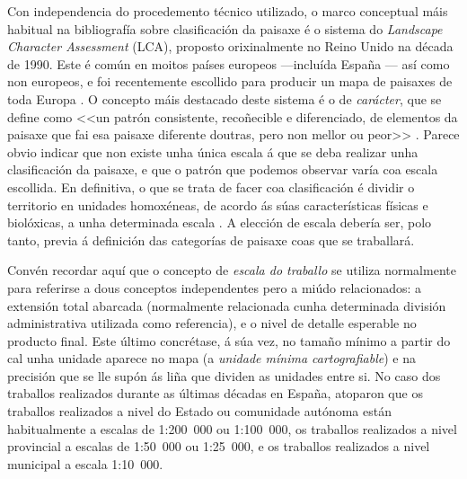 \documentclass[11pt,a4paper]{article}
\begin{document}
Con independencia do procedemento técnico utilizado, o marco conceptual máis habitual na bibliografía sobre clasificación da paisaxe é o sistema do \emph{Landscape Character Assessment} (LCA), proposto orixinalmente no Reino Unido na década de 1990. Este é común en moitos países europeos ---incluída España \citep{Valles2013}--- así como non europeos, e foi recentemente escollido para producir un mapa de paisaxes de toda Europa \citep{Wascher2005,Mucher201087}. O concepto máis destacado deste sistema é o de \emph{carácter}, que se define como <<un patrón consistente, recoñecible e diferenciado, de elementos da paisaxe que fai esa paisaxe diferente doutras, pero non mellor ou peor>> \citep{TheCountrysideAgency2002}. Parece obvio indicar que non existe unha única escala á que se deba realizar unha clasificación da paisaxe, e que o patrón que podemos observar varía coa escala escollida. En definitiva, o que se trata de facer coa clasificación é dividir o territorio en unidades homoxéneas, de acordo ás súas características físicas e biolóxicas, a unha determinada escala \citep{Capotorti2012174}. A elección de escala debería ser, polo tanto, previa á definición das categorías de paisaxe coas que se traballará.

Convén recordar aquí que o concepto de \emph{escala do traballo} se utiliza normalmente para referirse a dous conceptos independentes pero a miúdo relacionados: a extensión total abarcada (normalmente relacionada cunha determinada división administrativa utilizada como referencia), e o nivel de detalle esperable no producto final. Este último concrétase, á súa vez, no tamaño mínimo a partir do cal unha unidade aparece no mapa (a \emph{unidade mínima cartografiable}) e na precisión que se lle supón ás liña que dividen as unidades entre si. No caso dos traballos realizados durante as últimas décadas en España, \citet{Valles2013} atoparon que os traballos realizados a nivel do Estado ou comunidade autónoma están habitualmente a escalas de 1:200~000 ou 1:100~000, os traballos realizados a nivel provincial a escalas de 1:50~000 ou 1:25~000, e os traballos realizados a nivel municipal a escala 1:10~000. 


\end{document}
